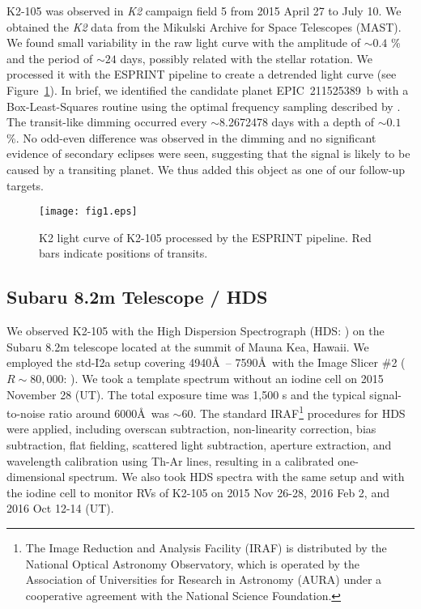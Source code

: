\documentclass[]{pasj01}
\begin{document}
K2-105 was observed in {\it K2} campaign field 5
from 2015 April 27 to July 10.
We obtained the {\it K2} data from the
Mikulski Archive for Space Telescopes (MAST).
We found small variability in the raw light curve
with the amplitude of $\sim0.4$ \% and the period of $\sim24$ days,
possibly related with the stellar rotation.
We processed it with the ESPRINT pipeline \citep{2015ApJ...812..112S}
to create a detrended light curve (see Figure~\ref{k2lightcurve}).
In brief, we identified the candidate planet EPIC~211525389~b with
a Box-Least-Squares routine \citep{2002A&A...391..369K, 2010ApJ...713L..87J}
using the optimal frequency sampling described by \citet{2014A&A...561A.138O}.
The transit-like dimming occurred every $\sim$8.2672478 days with a depth of $\sim0.1$ \%.
No odd-even difference was observed in the dimming and
no significant evidence of secondary eclipses were seen, suggesting that
the signal is likely to be caused by a transiting planet.
We thus added this object as one of our follow-up targets.

	\begin{figure}[tp]
			\texttt{[image: fig1.eps]} 
			\caption{K2 light curve of K2-105 processed by the ESPRINT pipeline.
			Red bars indicate positions of transits.
			\label{k2lightcurve}}
	\end{figure}

\subsection{Subaru 8.2m Telescope / HDS}

We observed K2-105 with the High Dispersion Spectrograph
(HDS: \cite{2002PASJ...54..855N}) on the Subaru 8.2m telescope
located at the summit of Mauna Kea, Hawaii.
We employed the std-I2a setup
covering 4940\AA\ -- 7590\AA\
with the Image Slicer \#2
($R\sim80,000$: \cite{2012PASJ...64...77T}).
We took a template spectrum without an iodine cell on 2015 November 28 (UT).
The total exposure time was 1,500 s and the typical signal-to-noise ratio
around 6000\AA\ was $\sim60$.
The standard IRAF\footnote{The Image Reduction and Analysis
  Facility (IRAF) is distributed by the National Optical Astronomy
  Observatory, which is operated by the Association of Universities
  for Research in Astronomy (AURA) under a cooperative agreement with
  the National Science Foundation.}
procedures for HDS were applied, including overscan subtraction, non-linearity correction,
bias subtraction, flat fielding, scattered light subtraction, aperture extraction,
and wavelength calibration using Th-Ar lines, resulting in a calibrated one-dimensional spectrum. 
We also took HDS spectra with the same setup and with the iodine cell
to monitor RVs of K2-105 on 2015 Nov 26-28, 2016 Feb 2, and 2016 Oct 12-14 (UT).
\end{document}
